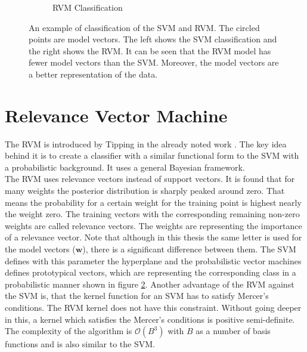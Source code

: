 \begin{figure}
\begin{subfigure}{.5\textwidth}
			\caption{RVM Classification\label{FigRVMModel}}
		\end{subfigure}
		\caption[Comparison of SVM and RVM Classification]{An example of classification of the SVM and RVM. The circled points are model vectors. The left shows the SVM classification and the right shows the RVM. It can be seen that the RVM model has fewer model vectors than the SVM. Moreover, the model vectors are a better representation of the data.\cite{Bishop.2000}\label{FigRVMProbEst}}
\end{figure}

\section{Relevance Vector Machine}\label{PcSecRVM}
The \ac{RVM} is introduced by Tipping in the already noted work \cite{Tipping.2001}.
The key idea behind it is to create a classifier with a similar functional form to the \ac{SVM} with a probabilistic background. 
It uses a general Bayesian framework.\\
The \acs{RVM} uses relevance vectors instead of support vectors.
It is found that for many weights the posterior distribution is sharply peaked around zero.
That means the probability for a certain weight for the training point is highest nearly the weight zero.
The training vectors with the corresponding remaining non-zero weights are called relevance vectors.
The weights are representing the importance of a relevance vector.\cite[p. 213]{Tipping.2001}
Note that although in this thesis the same letter is used for the model vectors ($\mathbf{w}$), there is a significant difference between them.
The \acs{SVM} defines with this parameter the hyperplane and the probabilistic vector machines defines prototypical vectors, which are representing the corresponding class in a probabilistic manner shown in figure \ref{FigRVMProbEst}.\cite[p. 222]{Tipping.2001}\newline
Another advantage of the \acs{RVM} against the \acs{SVM} is, that the kernel function for an \acs{SVM} has to satisfy Mercer's conditions.
The \ac{RVM} kernel does not have this constraint.\cite[p. 213]{Tipping.2001}\newline
Without going deeper in this, a kernel which satisfies the Mercer's conditions is positive semi-definite.\cite{Graepel.2002}
The complexity of the algorithm is $\mathcal{O}(B^3)$ with $B$ as a number of basis functions and is also similar to the \ac{SVM}.\cite[p. 236-237]{Tipping.2001}\newline
